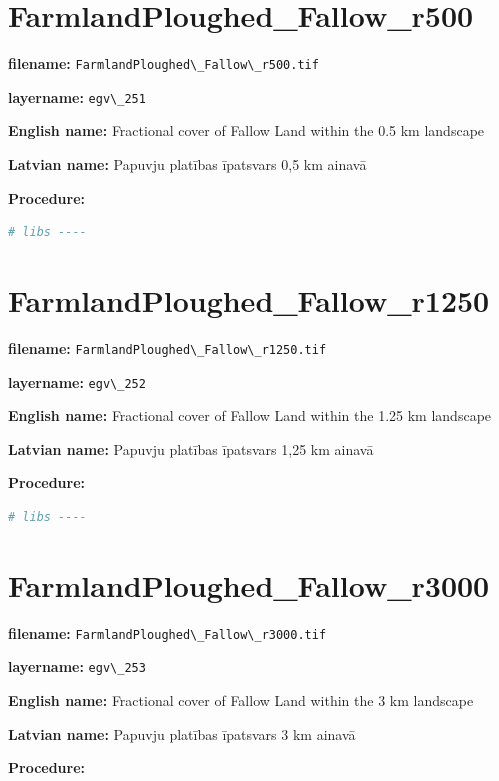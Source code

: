 \documentclass[
]{book}
\newcommand{\passthrough}[1]{#1}
\begin{document}
\section{FarmlandPloughed\_Fallow\_r500}\label{ch06.251}

\textbf{filename:} \passthrough{\lstinline!FarmlandPloughed\_Fallow\_r500.tif!}

\textbf{layername:} \passthrough{\lstinline!egv\_251!}

\textbf{English name:} Fractional cover of Fallow Land within the 0.5 km landscape

\textbf{Latvian name:} Papuvju platības īpatsvars 0,5 km ainavā

\textbf{Procedure:}

\begin{lstlisting}[language=R]
# libs ----
\end{lstlisting}

\section{FarmlandPloughed\_Fallow\_r1250}\label{ch06.252}

\textbf{filename:} \passthrough{\lstinline!FarmlandPloughed\_Fallow\_r1250.tif!}

\textbf{layername:} \passthrough{\lstinline!egv\_252!}

\textbf{English name:} Fractional cover of Fallow Land within the 1.25 km landscape

\textbf{Latvian name:} Papuvju platības īpatsvars 1,25 km ainavā

\textbf{Procedure:}

\begin{lstlisting}[language=R]
# libs ----
\end{lstlisting}

\section{FarmlandPloughed\_Fallow\_r3000}\label{ch06.253}

\textbf{filename:} \passthrough{\lstinline!FarmlandPloughed\_Fallow\_r3000.tif!}

\textbf{layername:} \passthrough{\lstinline!egv\_253!}

\textbf{English name:} Fractional cover of Fallow Land within the 3 km landscape

\textbf{Latvian name:} Papuvju platības īpatsvars 3 km ainavā

\textbf{Procedure:}
\end{document}
